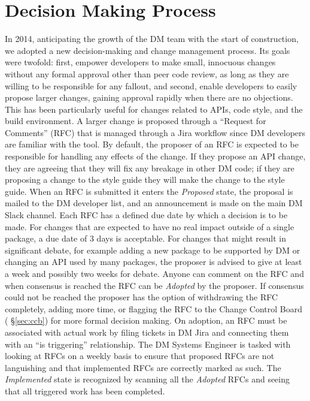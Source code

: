 \section{Decision Making Process}
In 2014, anticipating the growth of the DM team with the start of construction, we adopted a new decision-making and change management process.
Its goals were twofold: first, empower developers to make small, innocuous changes without any formal approval other than peer code review, as long as they are willing to be responsible for any fallout, and second, enable developers to easily propose larger changes, gaining approval rapidly when there are no objections.
This has been particularly useful for changes related to APIs, code style, and the build environment.
A larger change is proposed through a ``Request for Comments'' (RFC) that is managed through a Jira workflow since DM developers are familiar with the tool.
By default, the proposer of an RFC is expected to be responsible for handling any effects of the change.
If they propose an API change, they are agreeing that they will fix any breakage in other DM code; if they are proposing a change to the style guide they will make the change to the style guide.
When an RFC is submitted it enters the \emph{Proposed} state, the proposal is mailed to the DM developer list, and an announcement is made on the main DM Slack channel.
Each RFC has a defined due date by which a decision is to be made.
For changes that are expected to have no real impact outside of a single package, a due date of 3 days is acceptable.
For changes that might result in significant debate, for example adding a new package to be supported by DM or changing an API used by many packages, the proposer is advised to give at least a week and possibly two weeks for debate.
Anyone can comment on the RFC and when consensus is reached the RFC can be \emph{Adopted} by the proposer.
If consensus could not be reached the proposer has the option of withdrawing the RFC completely, adding more time, or flagging the RFC to the Change Control Board ( \S\ref{sec:ccb}) for more formal decision making.
On adoption, an RFC must be associated with actual work by filing tickets in DM Jira and connecting them with an ``is triggering'' relationship.
The DM Systems Engineer is tasked with looking at RFCs on a weekly basis to ensure that proposed RFCs are not languishing and that implemented RFCs are correctly marked as such.
The \emph{Implemented} state is recognized by scanning all the \emph{Adopted} RFCs and seeing that all triggered work has been completed.

